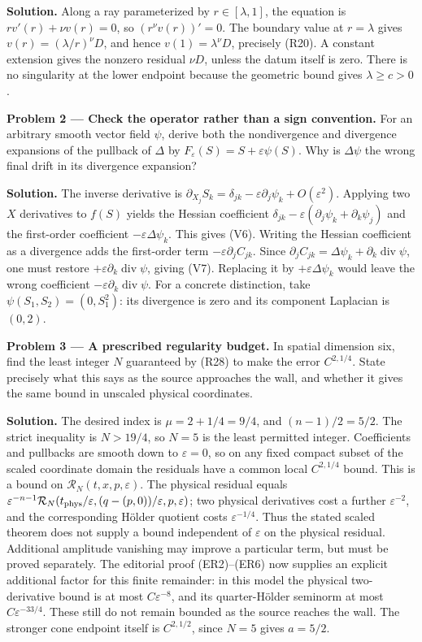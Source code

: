 \documentclass[
  11pt,
]{article}
\begin{document}
\textbf{Solution.} Along a ray parameterized by \(r\in[\lambda,1]\), the
equation is \(r v'(r)+\nu v(r)=0\), so \((r^\nu v(r))'=0\). The boundary
value at \(r=\lambda\) gives \(v(r)=(\lambda/r)^\nu D\), and hence
\(v(1)=\lambda^\nu D\), precisely (R20). A constant extension gives the
nonzero residual \(\nu D\), unless the datum itself is zero. There is no
singularity at the lower endpoint because the geometric bound gives
\(\lambda\geq c>0\).

\textbf{Problem 2 --- Check the operator rather than a sign convention.}
For an arbitrary smooth vector field \(\psi\), derive both the
nondivergence and divergence expansions of the pullback of \(\Delta\) by
\(F_\varepsilon(S)=S+\varepsilon\psi(S)\). Why is \(\Delta\psi\) the
wrong final drift in its divergence expansion?

\textbf{Solution.} The inverse derivative is
\(\partial_{X_j}S_k=\delta_{jk}-\varepsilon\partial_j\psi_k+O(\varepsilon^2)\).
Applying two \(X\) derivatives to \(f(S)\) yields the Hessian
coefficient
\(\delta_{jk}-\varepsilon(\partial_j\psi_k+\partial_k\psi_j)\) and the
first-order coefficient \(-\varepsilon\Delta\psi_k\). This gives (V6).
Writing the Hessian coefficient as a divergence adds the first-order
term \(-\varepsilon\partial_jC_{jk}\). Since
\(\partial_jC_{jk}=\Delta\psi_k+\partial_k\operatorname{div}\psi\), one
must restore \(+\varepsilon\partial_k\operatorname{div}\psi\), giving
(V7). Replacing it by \(+\varepsilon\Delta\psi_k\) would leave the wrong
coefficient \(-\varepsilon\partial_k\operatorname{div}\psi\). For a
concrete distinction, take \(\psi(S_1,S_2)=(0,S_1^2)\): its divergence
is zero and its component Laplacian is \((0,2)\).

\textbf{Problem 3 --- A prescribed regularity budget.} In spatial
dimension six, find the least integer \(N\) guaranteed by (R28) to make
the error \(C^{2,1/4}\). State precisely what this says as the source
approaches the wall, and whether it gives the same bound in unscaled
physical coordinates.

\textbf{Solution.} The desired index is \(\mu=2+1/4=9/4\), and
\((n-1)/2=5/2\). The strict inequality is \(N>19/4\), so \(N=5\) is the
least permitted integer. Coefficients and pullbacks are smooth down to
\(\varepsilon=0\), so on any fixed compact subset of the scaled
coordinate domain the residuals have a common local \(C^{2,1/4}\) bound.
This is a bound on \(\mathcal R_N(t,x,p,\varepsilon)\). The physical
residual equals
\(\varepsilon^{-n-1}\mathcal R_N(t_{\rm phys}/\varepsilon,(q-(p,0))/\varepsilon,p,\varepsilon)\);
two physical derivatives cost a further \(\varepsilon^{-2}\), and the
corresponding Hölder quotient costs \(\varepsilon^{-1/4}\). Thus the
stated scaled theorem does not supply a bound independent of
\(\varepsilon\) on the physical residual. Additional amplitude vanishing
may improve a particular term, but must be proved separately. The
editorial proof (ER2)--(ER6) now supplies an explicit additional factor
for this finite remainder: in this model the physical two-derivative
bound is at most \(C\varepsilon^{-8}\), and its quarter-Hölder seminorm
at most \(C\varepsilon^{-33/4}\). These still do not remain bounded as
the source reaches the wall. The stronger cone endpoint itself is
\(C^{2,1/2}\), since \(N=5\) gives \(a=5/2\).
\end{document}
